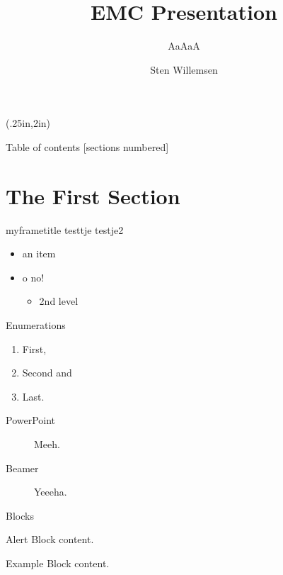 \documentclass[12pt]{beamer}
\author{Sten Willemsen}
\title{EMC Presentation}
\subtitle{AaAaA}
\begin{document}
\begin{frame}
	\titlepage
\begin{textblock*}{\textwidth}(.25in,2in)
\end{textblock*} 
\end{frame}


\begin{frame}{Table of contents}
  [sections numbered]
  \tableofcontents[hideallsubsections]
\end{frame}

\section{The First Section}

\begin{frame}{myframetitle}
testtje
testje2
\begin{itemize}
\item an item
\item o \alert{no}!
\begin{itemize}
\item 2nd level
\end{itemize}
\end{itemize}
\end{frame}

\begin{frame}{Enumerations}
      \begin{enumerate}
        \item First, \item Second and \item Last.
      \end{enumerate}
       \begin{description}
        \item[PowerPoint] Meeh. \item[Beamer] Yeeeha.
      \end{description}
\end{frame}

\begin{frame}{Blocks}
    \begin{alertblock}{Alert}
        Block content.
      \end{alertblock}

      \begin{exampleblock}{Example}
        Block content.
      \end{exampleblock}      
      
\end{frame}
\end{document}

